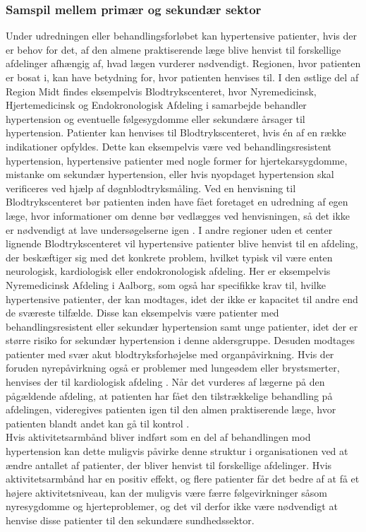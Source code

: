 \subsubsection{Samspil mellem primær og sekundær sektor}
Under udredningen eller behandlingsforløbet kan hypertensive patienter, hvis der er behov for det, af den almene praktiserende læge blive henvist til forskellige afdelinger afhængig af, hvad lægen vurderer nødvendigt. Regionen, hvor patienten er bosat i, kan have betydning for, hvor patienten henvises til. I den østlige del af Region Midt findes eksempelvis Blodtrykscenteret, hvor Nyremedicinsk, Hjertemedicinsk og Endokronologisk Afdeling i samarbejde behandler hypertension og eventuelle følgesygdomme eller sekundære årsager til hypertension. Patienter kan henvises til Blodtrykscenteret, hvis én af en række indikationer opfyldes. Dette kan eksempelvis være ved behandlingsresistent hypertension, hypertensive patienter med nogle former for hjertekarsygdomme, mistanke om sekundær hypertension, eller hvis nyopdaget hypertension skal verificeres ved hjælp af døgnblodtryksmåling. Ved en henvisning til Blodtrykscenteret bør patienten inden have fået foretaget en udredning af egen læge, hvor informationer om denne bør vedlægges ved henvisningen, så det ikke er nødvendigt at lave undersøgelserne igen \citep{aarhusuniversitetshospital}. I andre regioner uden et center lignende Blodtrykscenteret vil hypertensive patienter blive henvist til en afdeling, der beskæftiger sig med det konkrete problem, hvilket typisk vil være enten neurologisk, kardiologisk eller endokronologisk afdeling. Her er eksempelvis Nyremedicinsk Afdeling i Aalborg, som også har specifikke krav til, hvilke hypertensive patienter, der kan modtages, idet der ikke er kapacitet til andre end de sværeste tilfælde. Disse kan eksempelvis være patienter med behandlingsresistent eller sekundær hypertension samt unge patienter, idet der er større risiko for sekundær hypertension i denne aldersgruppe. Desuden modtages patienter med svær akut blodtryksforhøjelse med organpåvirkning. Hvis der foruden nyrepåvirkning også er problemer med lungeødem eller brystsmerter, henvises der til kardiologisk afdeling \citep{buur2011}. Når det vurderes af lægerne på den pågældende afdeling, at patienten har fået den tilstrækkelige behandling på afdelingen, videregives patienten igen til den almen praktiserende læge, hvor patienten blandt andet kan gå til kontrol \citep{sundhedsstyrelsen2010, lodberg2016}. \\
Hvis aktivitetsarmbånd bliver indført som en del af behandlingen mod hypertension kan dette muligvis påvirke denne struktur i organisationen ved at ændre antallet af patienter, der bliver henvist til forskellige afdelinger. Hvis aktivitetsarmbånd har en positiv effekt, og flere patienter får det bedre af at få et højere aktivitetsniveau, kan der muligvis være færre følgevirkninger såsom nyresygdomme og hjerteproblemer, og det vil derfor ikke være nødvendigt at henvise disse patienter til den sekundære sundhedssektor. 

